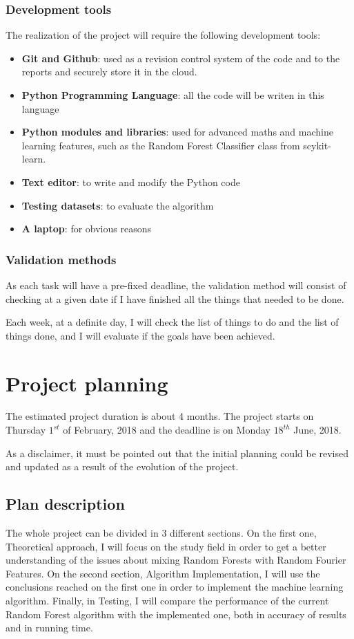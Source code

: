 \documentclass[a4paper]{article}
\begin{document}
        \subsubsection{Development tools}
        The realization of the project will require the following development tools:

        \begin{itemize}
            \item \textbf{Git and Github}: used as a revision control system of the code and to the reports and securely store it in the cloud.
            \item \textbf{Python Programming Language}: all the code will be writen in this language
            \item \textbf{Python modules and libraries}: used for advanced maths and machine learning features, such as the Random Forest Classifier class from scykit-learn.
            \item \textbf{Text editor}: to write and modify the Python code
            \item \textbf{Testing datasets}: to evaluate the algorithm
            \item \textbf{A laptop}: for obvious reasons
        \end{itemize}

        \subsubsection{Validation methods}
        As each task will have a pre-fixed deadline, the validation method will consist of checking at a given date if I have finished all the things that needed to be done.

        Each week, at a definite day, I will check the list of things to do and the list of things done, and I will evaluate if the goals have been achieved.

    \section{Project planning}
    The estimated project duration is about 4 months. The project starts on Thursday \(1^{st}\) of February, 2018 and the deadline is on Monday \(18^{th}\) June, 2018.

    As a disclaimer, it must be pointed out that the initial planning could be revised and updated as a result of the evolution of the project.

        \subsection{Plan description}
        The whole project can be divided in 3 different sections. On the first one, Theoretical approach, I will focus on the study field in order to get a better understanding of the issues about mixing Random Forests with Random Fourier Features. On the second section, Algorithm Implementation, I will use the conclusions reached on the first one in order to implement the machine learning algorithm. Finally, in Testing, I will compare the performance of the current Random Forest algorithm with the implemented one, both in accuracy of results and in running time.
\end{document}
